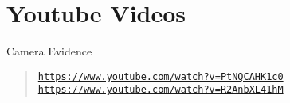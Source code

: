 \section*{Youtube Videos}

Camera Evidence \begin{quote}
\href{https://www.youtube.com/watch?v=PtNQCAHK1c0}{\tt https\+://www.\+youtube.\+com/watch?v=\+Pt\+N\+Q\+C\+A\+H\+K1c0} \href{https://www.youtube.com/watch?v=R2AnbXL41hM}{\tt https\+://www.\+youtube.\+com/watch?v=\+R2\+Anb\+X\+L41h\+M}\end{quote}
